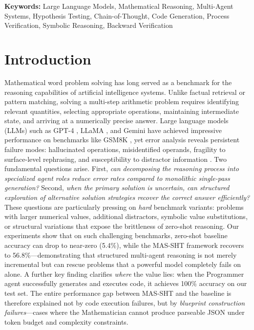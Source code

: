 \documentclass[11pt,a4paper]{article}
\begin{document}
\noindent\textbf{Keywords:} Large Language Models, Mathematical Reasoning, Multi-Agent Systems, Hypothesis Testing, Chain-of-Thought, Code Generation, Process Verification, Symbolic Reasoning, Backward Verification
\section{Introduction}
\label{sec:introduction}
Mathematical word problem solving has long served as a benchmark for the reasoning capabilities of artificial intelligence systems.
Unlike factual retrieval or pattern matching, solving a multi-step arithmetic problem requires identifying relevant quantities, selecting appropriate operations, maintaining intermediate state, and arriving at a numerically precise answer.
Large language models (LLMs) such as GPT-4 \citep{openai2023gpt4}, LLaMA \citep{touvron2023llama}, and Gemini \citep{team2023gemini} have achieved impressive performance on benchmarks like GSM8K \citep{cobbe2021gsm8k}, yet error analysis reveals persistent failure modes: hallucinated operations, misidentified operands, fragility to surface-level rephrasing, and susceptibility to distractor information \citep{shi2023gsmsymbolic,li2024gsmplus}.
Two fundamental questions arise.
First, \emph{can decomposing the reasoning process into specialized agent roles reduce error rates compared to monolithic single-pass generation?}
Second, \emph{when the primary solution is uncertain, can structured exploration of alternative solution strategies recover the correct answer efficiently?}
These questions are particularly pressing on \emph{hard} benchmark variants: problems with larger numerical values, additional distractors, symbolic value substitutions, or structural variations that expose the brittleness of zero-shot reasoning.
Our experiments show that on such challenging benchmarks, zero-shot baseline accuracy can drop to near-zero (5.4\%), while the MAS-SHT framework recovers to 56.8\%---demonstrating that structured multi-agent reasoning is not merely incremental but can rescue problems that a powerful model completely fails on alone.
A further key finding clarifies \emph{where} the value lies: when the Programmer agent successfully generates and executes code, it achieves 100\% accuracy on our test set.
The entire performance gap between MAS-SHT and the baseline is therefore explained not by code execution failures, but by \emph{blueprint construction failures}---cases where the Mathematician cannot produce parseable JSON under token budget and complexity constraints.
\end{document}
